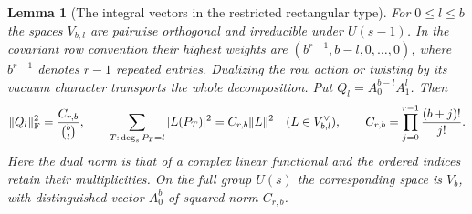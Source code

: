 \documentclass[a4paper,11pt]{article}
\newtheorem{lemma}[proposition]{Lemma}
\theoremstyle{definition}
\theoremstyle{remark}
\numberwithin{equation}{section}
\begin{document}
\begin{lemma}[The integral vectors in the restricted rectangular type]
\label{lem:branch243}
For \(0\le l\le b\) the spaces \(V_{b,l}\) are pairwise
orthogonal and irreducible under \(U(s-1)\). In the covariant
row convention their highest weights are
\((b^{r-1},b-l,0,\ldots,0)\), where \(b^{r-1}\) denotes
\(r-1\) repeated entries. Dualizing the row action or twisting
by its vacuum character transports the whole decomposition.
Put \(Q_l=A_0^{b-l}A_1^l\). Then
\[
 \|Q_l\|_{\rm F}^2=\frac{C_{r,b}}{\binom bl},\qquad
 \sum_{T:\,\deg_s P_T=l}|L(P_T)|^2=C_{r,b}\|L\|^2
                         \quad (L\in V_{b,l}^\vee),
 \qquad C_{r,b}=\prod_{j=0}^{r-1}\frac{(b+j)!}{j!}.
\]
Here the dual norm is that of a complex linear functional and
the ordered indices retain their multiplicities. On the full group
\(U(s)\) the corresponding space is \(V_b\), with distinguished
vector \(A_0^b\) of squared norm \(C_{r,b}\).
\end{lemma}
\end{document}
